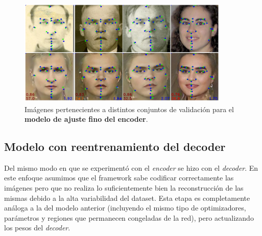     \begin{figure}[!h]
        \centering
        \includegraphics[width=0.9\textwidth]{img/image_encoder.png}
        \caption{Imágenes pertenecientes a distintos conjuntos de validación para el \textbf{modelo de ajuste fino del encoder}.}
        \label{fig:Ejemplo_encoder}
    \end{figure}

    \subsection{Modelo con reentrenamiento del decoder}
        \noindent Del mismo modo en que se experimentó con el \textit{encoder} se hizo con el \textit{decoder}. En este enfoque asumimos que el framework sabe codificar correctamente las imágenes pero que no realiza lo suficientemente bien la reconstrucción de las mismas debido a la alta variabilidad del dataset. Esta etapa es completamente análoga a la del modelo anterior (incluyendo el mismo tipo de optimizadores, parámetros y regiones que permanecen congeladas de la red), pero actualizando los pesos del \textit{decoder}.

